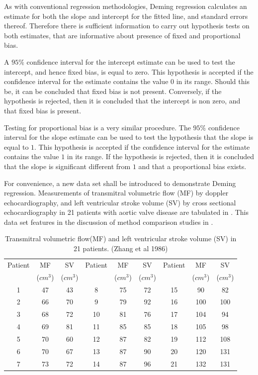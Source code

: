 \documentclass[12pt, a4paper]{report}
\theoremstyle{plain}
\theoremstyle{definition}
\theoremstyle{remark}
\begin{document}
As with conventional regression methodologies, Deming regression
calculates an estimate for both the slope and intercept for the
fitted line, and standard errors thereof. Therefore there is
sufficient information to carry out hypothesis tests on both
estimates, that are informative about presence of fixed and
proportional bias.

A $95\%$ confidence interval for the intercept estimate can be
used to test the intercept, and hence fixed bias, is equal to
zero. This hypothesis is accepted if the confidence interval for
the estimate contains the value $0$ in its range. Should this be,
it can be concluded that fixed bias is not present. Conversely, if
the hypothesis is rejected, then it is concluded that the
intercept is non zero, and that fixed bias is present.

Testing for proportional bias is a very similar procedure. The
$95\%$ confidence interval for the slope estimate can be used to
test the hypothesis that the slope is equal to $1$. This
hypothesis is accepted if the confidence interval for the estimate
contains the value $1$ in its range. If the hypothesis is
rejected, then it is concluded that the slope is significant
different from $1$ and that a proportional bias exists.

For convenience, a new data set shall be introduced to demonstrate
Deming regression. Measurements of transmitral volumetric flow
(MF) by doppler echocardiography, and left ventricular stroke
volume (SV) by cross sectional echocardiography in 21 patients
with aortic valve disease are tabulated in \citet{zhang}. This
data set features in the discussion of method comparison studies
in \citet[p.398]{AltmanBook} .


\begin{table}[h!]
\begin{center}
\begin{tabular}{|c|c|c||c|c|c||c|c|c|}
  \hline
 Patient & MF  & SV  & Patient & MF  & SV  & Patient & MF  & SV \\
 &($cm^{3}$)&  ($cm^{3}$) & &($cm^{3}$)&  ($cm^{3}$) & &($cm^{3}$)&  ($cm^{3}$)
 \\
  \hline
1 & 47 & 43 &  8 & 75 & 72 &  15 & 90 & 82 \\
  2 & 66 & 70 & 9 & 79 & 92 &  16 & 100 & 100 \\
  3 & 68 & 72 & 10 & 81 & 76 & 17 & 104 & 94 \\
  4 & 69 & 81 & 11 & 85 & 85 &  18 & 105 & 98 \\
  5 & 70 & 60 & 12 & 87 & 82 & 19 & 112 & 108 \\
  6 & 70 & 67 & 13 & 87 & 90 & 20 & 120 & 131 \\
  7 & 73 & 72 & 14 & 87 & 96 &  21 & 132 & 131 \\

   \hline
\end{tabular}
\caption{Transmitral volumetric flow(MF) and left ventricular
stroke volume (SV) in 21 patients. (Zhang et al 1986)}
\end{center}
\end{table}
\end{document}
